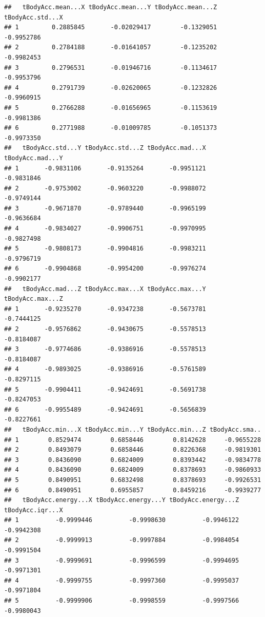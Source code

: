 \documentclass[
]{article}
\begin{document}
\begin{verbatim}
##   tBodyAcc.mean...X tBodyAcc.mean...Y tBodyAcc.mean...Z tBodyAcc.std...X
## 1         0.2885845       -0.02029417        -0.1329051       -0.9952786
## 2         0.2784188       -0.01641057        -0.1235202       -0.9982453
## 3         0.2796531       -0.01946716        -0.1134617       -0.9953796
## 4         0.2791739       -0.02620065        -0.1232826       -0.9960915
## 5         0.2766288       -0.01656965        -0.1153619       -0.9981386
## 6         0.2771988       -0.01009785        -0.1051373       -0.9973350
##   tBodyAcc.std...Y tBodyAcc.std...Z tBodyAcc.mad...X tBodyAcc.mad...Y
## 1       -0.9831106       -0.9135264       -0.9951121       -0.9831846
## 2       -0.9753002       -0.9603220       -0.9988072       -0.9749144
## 3       -0.9671870       -0.9789440       -0.9965199       -0.9636684
## 4       -0.9834027       -0.9906751       -0.9970995       -0.9827498
## 5       -0.9808173       -0.9904816       -0.9983211       -0.9796719
## 6       -0.9904868       -0.9954200       -0.9976274       -0.9902177
##   tBodyAcc.mad...Z tBodyAcc.max...X tBodyAcc.max...Y tBodyAcc.max...Z
## 1       -0.9235270       -0.9347238       -0.5673781       -0.7444125
## 2       -0.9576862       -0.9430675       -0.5578513       -0.8184087
## 3       -0.9774686       -0.9386916       -0.5578513       -0.8184087
## 4       -0.9893025       -0.9386916       -0.5761589       -0.8297115
## 5       -0.9904411       -0.9424691       -0.5691738       -0.8247053
## 6       -0.9955489       -0.9424691       -0.5656839       -0.8227661
##   tBodyAcc.min...X tBodyAcc.min...Y tBodyAcc.min...Z tBodyAcc.sma..
## 1        0.8529474        0.6858446        0.8142628     -0.9655228
## 2        0.8493079        0.6858446        0.8226368     -0.9819301
## 3        0.8436090        0.6824009        0.8393442     -0.9834778
## 4        0.8436090        0.6824009        0.8378693     -0.9860933
## 5        0.8490951        0.6832498        0.8378693     -0.9926531
## 6        0.8490951        0.6955857        0.8459216     -0.9939277
##   tBodyAcc.energy...X tBodyAcc.energy...Y tBodyAcc.energy...Z tBodyAcc.iqr...X
## 1          -0.9999446          -0.9998630          -0.9946122       -0.9942308
## 2          -0.9999913          -0.9997884          -0.9984054       -0.9991504
## 3          -0.9999691          -0.9996599          -0.9994695       -0.9971301
## 4          -0.9999755          -0.9997360          -0.9995037       -0.9971804
## 5          -0.9999906          -0.9998559          -0.9997566       -0.9980043

\end{verbatim}
\end{document}
